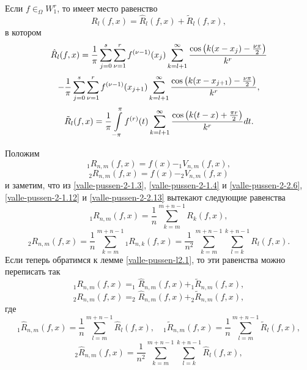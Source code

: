 \begin{lemma}\label{valle-pussen-l2.1}
Если $f\in _\Omega W_1^r$, то имеет место равенство
\begin{equation}\label{valle-pussen-2-2.9}
R_l(f,x)= \hat R_l(f,x)+\tilde R_l(f,x),
   \end{equation}
в котором
$$
 \hat R_l(f,x)=\frac{1}{\pi}\sum_{j=0}^s
\sum_{\nu=1}^rf^{(\nu-1)}(x_j)\sum_{k=l+1}^\infty
{\cos\left(k(x-x_j)-\frac{\nu\pi}{2}\right)\over k^r}
$$
\begin{equation}\label{valle-pussen-2-2.10}
-\frac{1}{\pi}\sum_{j=0}^s
\sum_{\nu=1}^r f^{(\nu-1)}(x_{j+1})\sum_{k=l+1}^\infty
{\cos\left(k(x-x_{j+1})-\frac{\nu\pi}{2}\right)\over k^r},
\end{equation}
\begin{equation}\label{valle-pussen-2-2.11}
\tilde R_l(f,x)=\frac1{\pi}\int\limits_{-\pi}^{\pi}f^{(r)}(t)\sum_{k=l+1}^\infty
{\cos\left(k(t-x)+\frac{\pi r}{2}\right)\over k^r}dt.
\end{equation}
\end{lemma}
Положим
\begin{equation}\label{valle-pussen-2-2.12}
_1R_{n,m}(f,x)=f(x)-_1V_{n,m}(f,x),
\end{equation}
\begin{equation}\label{valle-pussen-2-2.13}
_2R_{n,m}(f,x)=f(x)-_2V_{n,m}(f,x)
\end{equation}
и заметим, что из \eqref{valle-pussen-2-1.3}, \eqref{valle-pussen-2-1.4} и \eqref{valle-pussen-2-2.6}, \eqref{valle-pussen-2-1.12} и \eqref{valle-pussen-2-2.13} вытекают следующие равенства
$$
_1R_{n,m}(f,x)=\frac1n\sum_{k=m}^{m+n-1}R_k(f,x),
$$
$$
_2R_{n,m}(f,x)=\frac1n\sum_{k=m}^{m+n-1}
{_1}R_{n,k}(f,x)=\frac1{n^2}\sum_{k=m}^{m+n-1}
\sum_{l=k}^{k+n-1}R_l(f,x).
$$
Если теперь обратимся к лемме \ref{valle-pussen-l2.1}, то эти равенства можно переписать так
\begin{equation}\label{valle-pussen-2-2.14}
_1R_{n,m}(f,x)=_1\hat R_{n,m}(f,x)+_1\tilde R_{n,m}(f,x),
\end{equation}
\begin{equation}\label{valle-pussen-2-2.15}
_2R_{n,m}(f,x)=_2\hat R_{n,m}(f,x)+_2\tilde R_{n,m}(f,x),
\end{equation}
где
\begin{equation}\label{valle-pussen-2-2.16}
_1\hat R_{n,m}(f,x)=\frac1{n}
\sum_{l=m}^{m+n-1}\hat R_l(f,x),\quad_1\tilde R_{n,m}(f,x)=\frac1{n}
\sum_{l=m}^{m+n-1}\tilde R_l(f,x),
\end{equation}
\begin{equation}\label{valle-pussen-2-2.17}
_2\hat R_{n,m}(f,x)=\frac1{n^2}\sum_{k=m}^{m+n-1}
\sum_{l=k}^{k+n-1}\hat R_l(f,x),
\end{equation}
